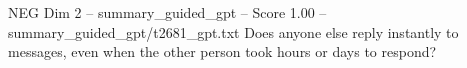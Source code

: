 \begin{textsample}{NEG Dim 2 – summary\_guided\_gpt – Score 1.00 – summary\_guided\_gpt/t2681\_gpt.txt}  \label{ex:f2_neg_037}
Does anyone else reply instantly to messages, even when the other person took hours or days to respond?

\end{textsample}
